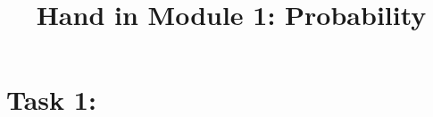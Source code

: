 \documentclass[11pt]{amsart}
\title{Hand in Module 1: Probability}
\author}
\begin{document}
	
	\maketitle
	
	\section{Task 1:}
	
\end{document}
